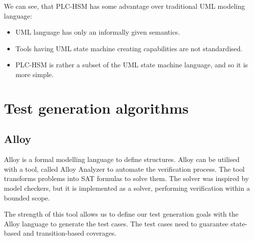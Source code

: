 
We can see, that PLC-HSM has some advantage over traditional UML modeling language:

\begin{itemize}
	\item UML language has only an informally given semantics.
	\item Tools having UML state machine creating capabilities are not standardised.
	\item PLC-HSM is rather a subset of the UML state machine language, and so it is more simple.
\end{itemize}


\section{Test generation algorithms}
\label{sec:testgenerationalgorithms}

\subsection{Alloy}
\label{sub:alloy}

Alloy is a formal modelling language to define structures. Alloy can be utilised with a tool, called Alloy Analyzer to automate the verification process. The tool transforms problems into SAT formulas to solve them. The solver was inspired by model checkers, but it is implemented as a solver, performing verification within a bounded scope.

The strength of this tool allows us to define our test generation goals with the Alloy language to generate the test cases. The test cases need to guarantee state-based and transition-based coverages.




